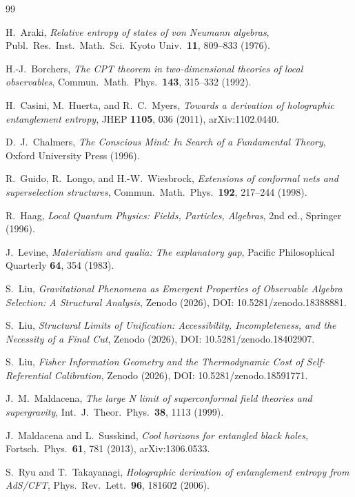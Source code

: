 \documentclass[12pt]{article}
\theoremstyle{definition}
\theoremstyle{remark}
\begin{document}
\begin{thebibliography}{99}

H.~Araki,
\emph{Relative entropy of states of von Neumann algebras},
Publ.\ Res.\ Inst.\ Math.\ Sci.\ Kyoto Univ.\ \textbf{11}, 809--833 (1976).

H.-J.~Borchers,
\emph{The CPT theorem in two-dimensional theories of local observables},
Commun.\ Math.\ Phys.\ \textbf{143}, 315--332 (1992).

H.~Casini, M.~Huerta, and R.~C.~Myers,
\emph{Towards a derivation of holographic entanglement entropy},
JHEP \textbf{1105}, 036 (2011),
arXiv:1102.0440.

D.~J.~Chalmers,
\emph{The Conscious Mind: In Search of a Fundamental Theory},
Oxford University Press (1996).

R.~Guido, R.~Longo, and H.-W.~Wiesbrock,
\emph{Extensions of conformal nets and superselection structures},
Commun.\ Math.\ Phys.\ \textbf{192}, 217--244 (1998).

R.~Haag,
\emph{Local Quantum Physics: Fields, Particles, Algebras},
2nd ed., Springer (1996).

J.~Levine,
\emph{Materialism and qualia: The explanatory gap},
Pacific Philosophical Quarterly \textbf{64}, 354 (1983).

S.~Liu,
\emph{Gravitational Phenomena as Emergent Properties of Observable Algebra Selection: A Structural Analysis},
Zenodo (2026), DOI: 10.5281/zenodo.18388881.

S.~Liu,
\emph{Structural Limits of Unification: Accessibility, Incompleteness, and the Necessity of a Final Cut},
Zenodo (2026), DOI: 10.5281/zenodo.18402907.

S.~Liu,
\emph{Fisher Information Geometry and the Thermodynamic Cost of Self-Referential Calibration},
Zenodo (2026), DOI: 10.5281/zenodo.18591771.

J.~M.~Maldacena,
\emph{The large N limit of superconformal field theories and supergravity},
Int.\ J.\ Theor.\ Phys.\ \textbf{38}, 1113 (1999).

J.~Maldacena and L.~Susskind,
\emph{Cool horizons for entangled black holes},
Fortsch.\ Phys.\ \textbf{61}, 781 (2013),
arXiv:1306.0533.

S.~Ryu and T.~Takayanagi,
\emph{Holographic derivation of entanglement entropy from AdS/CFT},
Phys.\ Rev.\ Lett.\ \textbf{96}, 181602 (2006).


\end{thebibliography}
\end{document}
